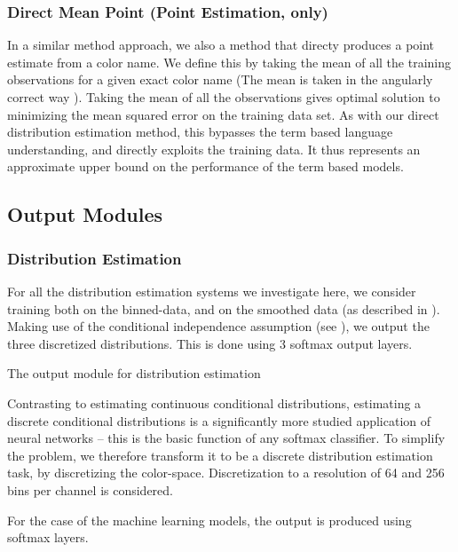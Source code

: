 \documentclass[11pt,a4paper]{article}
\begin{document}
\subsubsection{Direct Mean Point (Point Estimation, only)}
In a similar method approach, we also a method that directy produces a point estimate from a color name.
We define this by taking the mean of all the training observations for a given exact color name  (The mean is taken in the angularly correct way ).
Taking the mean of all the observations gives optimal solution to minimizing the mean squared error on the training data set.
As with our direct distribution estimation method, this bypasses the term based language understanding, and directly exploits the training data.
It thus represents an approximate upper bound on the performance of the term based models.




\subsection{Output Modules}
\subsubsection{Distribution Estimation}

For all the distribution estimation systems we investigate here, 
we consider training both on the binned-data, and on the smoothed data (as described in ).
Making use of the conditional independence assumption (see ), we output the three discretized distributions.
This is done using 3 softmax output layers.

The output module for distribution estimation 

Contrasting to estimating continuous conditional distributions, 
estimating a discrete conditional distributions is a significantly more studied application of neural networks
-- this is the basic function of any softmax classifier.
To simplify the problem, we therefore transform it to be a discrete distribution estimation task, by discretizing the color-space.
Discretization to a resolution of 64 and 256 bins per channel is considered.


For the case of the machine learning models, the output is produced using softmax layers.
\end{document}
